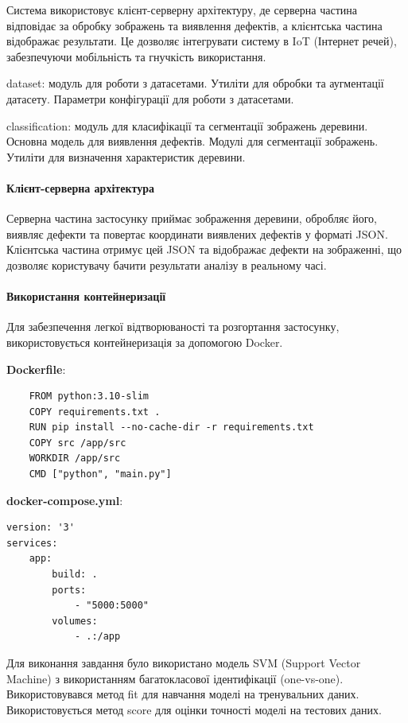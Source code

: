 \documentclass[oneside,14pt]{extarticle}
\begin{document}
Система використовує клієнт-серверну архітектуру, де серверна частина відповідає за обробку зображень та виявлення дефектів, а клієнтська частина відображає результати. Це дозволяє інтегрувати систему в IoT (Інтернет речей), забезпечуючи мобільність та гнучкість використання.

\begin{list}{-}{Основні компоненти проекту}
	\item dataset: модуль для роботи з датасетами. Утиліти для обробки та аугментації датасету. Параметри конфігурації для роботи з датасетами.
	\item classification: модуль для класифікації та сегментації зображень деревини. Основна модель для виявлення дефектів. Модулі для сегментації зображень. Утиліти для визначення характеристик деревини.
\end{list}

\paragraph{Клієнт-серверна архітектура}

Серверна частина застосунку приймає зображення деревини, обробляє його, виявляє дефекти та повертає координати виявлених дефектів у форматі JSON. Клієнтська частина отримує цей JSON та відображає дефекти на зображенні, що дозволяє користувачу бачити результати аналізу в реальному часі.

\paragraph{Використання контейнеризації}

Для забезпечення легкої відтворюваності та розгортання застосунку, використовується контейнеризація за допомогою Docker.

\textbf{Dockerfile}:

\begin{lstlisting}
	FROM python:3.10-slim
	COPY requirements.txt .
	RUN pip install --no-cache-dir -r requirements.txt
	COPY src /app/src
	WORKDIR /app/src
	CMD ["python", "main.py"]
\end{lstlisting}

\textbf{docker-compose.yml}:

\begin{lstlisting}
version: '3'
services:
	app:
		build: .
		ports:
			- "5000:5000"
		volumes:
			- .:/app
\end{lstlisting}

Для виконання завдання було використано модель SVM (Support Vector Machine) з використанням багатокласової ідентифікації (one-vs-one). Використовувався метод fit для навчання моделі на тренувальних даних. Використовується метод score для оцінки точності моделі на тестових даних.
\end{document}
